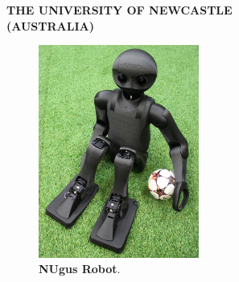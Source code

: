 \documentclass[10pt,a4paper]{article}
\begin{document}
\begin{multicols}{2}
\columnbreak

\begin{center}
	\colorbox[rgb]{0.0, 0.0, 0.0}
	{
	\begin{minipage}[c][3.5em][c]{0.45\textwidth}
		\begin{center}
			{\color{textcolour}
				{
				\textbf{THE UNIVERSITY OF NEWCASTLE \\
				(AUSTRALIA)}
				}
			}
		\end{center}
	\end{minipage}
	}
\end{center}

\begin{figure}[H]
	\begin{center}
		\includegraphics[width=0.47\textwidth]{NUgus1}\\
		\textbf{NUgus Robot}.
	\end{center}
\end{figure}

\end{multicols}
\end{document}
